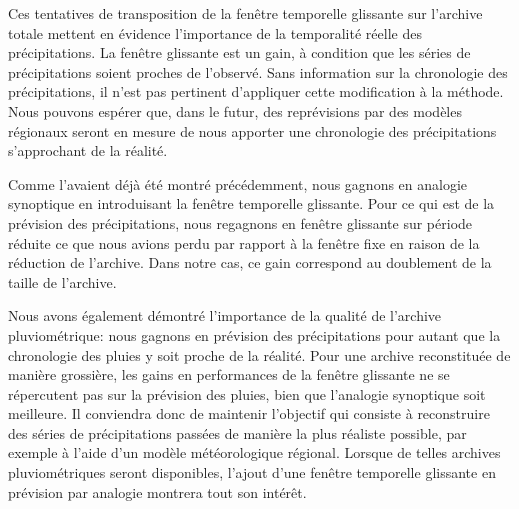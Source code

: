 \documentclass[hess]{copernicus}
\begin{document}
Ces tentatives de transposition de la fenêtre temporelle glissante sur l'archive totale mettent en évidence l'importance de la temporalité réelle des précipitations. La fenêtre glissante est un gain, à condition que les séries de précipitations soient proches de l'observé. Sans information sur la chronologie des précipitations, il n'est pas pertinent d'appliquer cette modification à la méthode. Nous pouvons espérer que, dans le futur, des reprévisions par des modèles régionaux seront en mesure de nous apporter une chronologie des précipitations s'approchant de la réalité.


\conclusions  %

Comme \citet{Finet2008} l'avaient déjà été montré précédemment, nous gagnons en analogie synoptique en introduisant la fenêtre temporelle glissante. Pour ce qui est de la prévision des précipitations, nous regagnons en fenêtre glissante sur période réduite ce que nous avions perdu par rapport à la fenêtre fixe en raison de la réduction de l'archive. Dans notre cas, ce gain correspond au doublement de la taille de l'archive.

Nous avons également démontré l'importance de la qualité de l'archive pluviométrique: nous gagnons en prévision des précipitations pour autant que la chronologie des pluies y soit proche de la réalité. Pour une archive reconstituée de manière grossière, les gains en performances de la fenêtre glissante ne se répercutent pas sur la prévision des pluies, bien que l'analogie synoptique soit meilleure. Il conviendra donc de maintenir l'objectif qui consiste à reconstruire des séries de précipitations passées de manière la plus réaliste possible, par exemple à l'aide d'un modèle météorologique régional. Lorsque de telles archives pluviométriques seront disponibles, l'ajout d'une fenêtre temporelle glissante en prévision par analogie montrera tout son intérêt.




\appendix
\section{}    %

\subsection{}                               %
\end{document}
